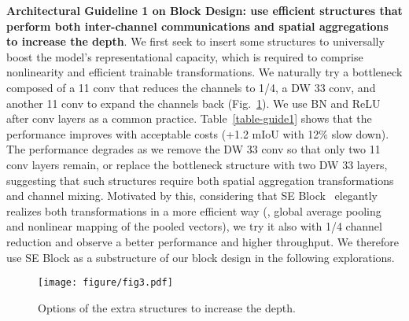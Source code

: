 \documentclass[10pt,twocolumn,letterpaper]{article}
\begin{document}
\noindent\textbf{Architectural Guideline 1 on Block Design: use efficient structures that perform both inter-channel communications and spatial aggregations to increase the depth}. We first seek to insert some structures to universally boost the model's representational capacity, which is required to comprise nonlinearity and efficient trainable transformations. We naturally try a bottleneck composed of a 11 conv that reduces the channels to 1/4, a DW 33 conv, and another 11 conv to expand the channels back (Fig.~\ref{fig-se}). We use BN and ReLU after conv layers as a common practice. Table~\ref{table-guide1} shows that the performance improves with acceptable costs (+1.2 mIoU with 12\% slow down). The performance degrades as we remove the DW 33 conv so that only two 11 conv layers remain, or replace the bottleneck structure with two DW 33 layers, suggesting that such structures require both spatial aggregation transformations and channel mixing. Motivated by this, considering that SE Block~\cite{hu2018squeeze} elegantly realizes both transformations in a more efficient way (\ie, global average pooling and nonlinear mapping of the pooled vectors), we try it also with 1/4 channel reduction and observe a better performance and higher throughput. We therefore use SE Block as a substructure of our block design in the following explorations.

	\begin{figure}
		\begin{center}
			\texttt{[image: figure/fig3.pdf]}
			\vspace{-0.3in}
			\caption{Options of the extra structures to increase the depth.}
			\label{fig-se}
			\vspace{-0.25in}
		\end{center}
	\end{figure}
\end{document}
